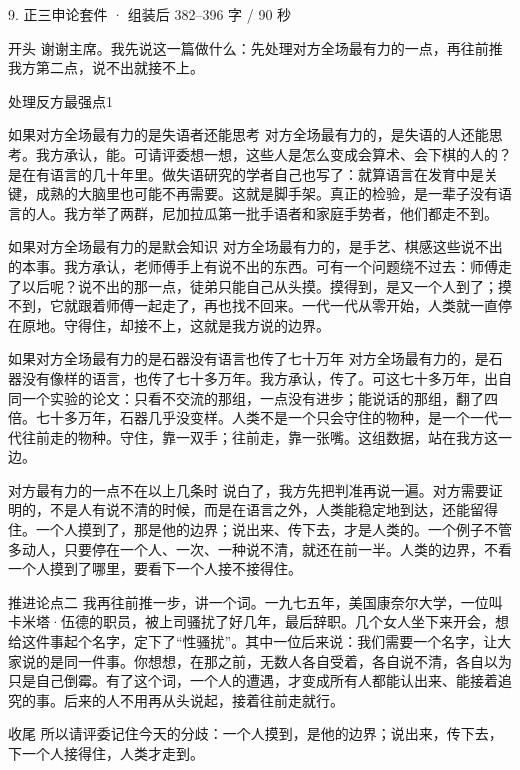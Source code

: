 \documentclass[script,pro]{debate}
\begin{document}
\begin{kit}{9. 正三申论}{套件 · 组装后 382–396 字 / 90 秒}
\begin{fixed}{开头}
谢谢主席。我先说这一篇做什么：先处理对方全场最有力的一点，再往前推我方第二点，说不出就接不上。
\end{fixed}
\begin{pick}{处理反方最强点}{1}
\begin{module}{如果对方全场最有力的是失语者还能思考}
对方全场最有力的，是失语的人还能思考。我方承认，能。可请评委想一想，这些人是怎么变成会算术、会下棋的人的？是在有语言的几十年里。做失语研究的学者自己也写了：就算语言在发育中是关键，成熟的大脑里也可能不再需要。这就是脚手架。真正的检验，是一辈子没有语言的人。我方举了两群，尼加拉瓜第一批手语者和家庭手势者，他们都走不到。
\end{module}
\begin{module}{如果对方全场最有力的是默会知识}
对方全场最有力的，是手艺、棋感这些说不出的本事。我方承认，老师傅手上有说不出的东西。可有一个问题绕不过去：师傅走了以后呢？说不出的那一点，徒弟只能自己从头摸。摸得到，是又一个人到了；摸不到，它就跟着师傅一起走了，再也找不回来。一代一代从零开始，人类就一直停在原地。守得住，却接不上，这就是我方说的边界。
\end{module}
\begin{module}{如果对方全场最有力的是石器没有语言也传了七十万年}
对方全场最有力的，是石器没有像样的语言，也传了七十多万年。我方承认，传了。可这七十多万年，出自同一个实验的论文：只看不交流的那组，一点没有进步；能说话的那组，翻了四倍。七十多万年，石器几乎没变样。人类不是一个只会守住的物种，是一个一代一代往前走的物种。守住，靠一双手；往前走，靠一张嘴。这组数据，站在我方这一边。
\end{module}
\begin{fallback}{对方最有力的一点不在以上几条时}
说白了，我方先把判准再说一遍。对方需要证明的，不是人有说不清的时候，而是在语言之外，人类能稳定地到达，还能留得住。一个人摸到了，那是他的边界；说出来、传下去，才是人类的。一个例子不管多动人，只要停在一个人、一次、一种说不清，就还在前一半。人类的边界，不看一个人摸到了哪里，要看下一个人接不接得住。
\end{fallback}
\end{pick}
\begin{fixed}{推进论点二}
我再往前推一步，讲一个词。一九七五年，美国康奈尔大学，一位叫卡米塔·伍德的职员，被上司骚扰了好几年，最后辞职。几个女人坐下来开会，想给这件事起个名字，定下了“性骚扰”。其中一位后来说：我们需要一个名字，让大家说的是同一件事。你想想，在那之前，无数人各自受着，各自说不清，各自以为只是自己倒霉。有了这个词，一个人的遭遇，才变成所有人都能认出来、能接着追究的事。后来的人不用再从头说起，接着往前走就行。
\end{fixed}
\begin{fixed}{收尾}
所以请评委记住今天的分歧：一个人摸到，是他的边界；说出来，传下去，下一个人接得住，人类才走到。
\end{fixed}
\end{kit}
\end{document}
